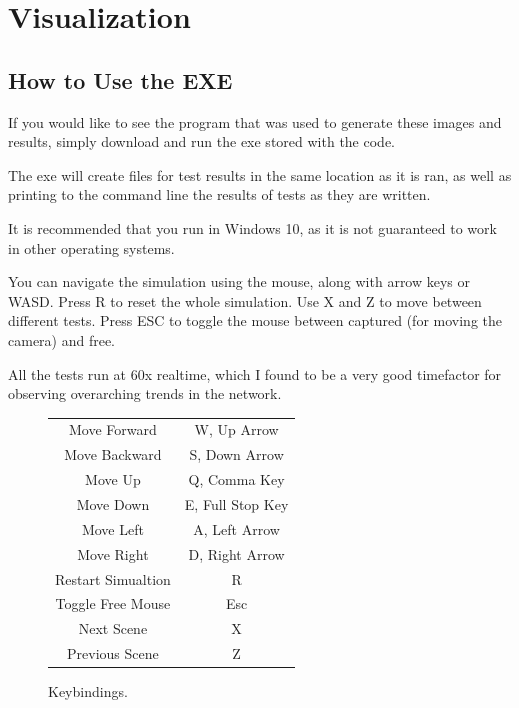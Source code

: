 \documentclass[12pt,a4paper,twoside,openright]{report}
\begin{document}
\section{Visualization}



\subsection{How to Use the EXE}

If you would like to see the program that was used to generate these images and results, simply download and run the exe stored with the code.

The exe will create files for test results in the same location as it is ran, as well as printing to the command line the results of tests as they are written.

It is recommended that you run in Windows 10, as it is not guaranteed to work in other operating systems.

You can navigate the simulation using the mouse, along with arrow keys or WASD. Press R to reset the whole simulation. Use X and Z to move between different tests. Press ESC to toggle the mouse between captured (for moving the camera) and free.

All the tests run at 60x realtime, which I found to be a very good timefactor for observing overarching trends in the network.

\begin{figure}
\begin{center}
\label{fig:Keybindings}
\caption{Keybindings.}
\begin{tabular}{ | c | c  | }
	\hline
	Move Forward & W, Up Arrow \\
	Move Backward & S, Down Arrow\\
	Move Up & Q, Comma Key\\
	Move Down & E, Full Stop Key\\
	Move Left & A, Left Arrow \\
	Move Right & D, Right Arrow \\
	Restart Simualtion & R \\
	Toggle Free Mouse & Esc \\
	Next Scene & X\\
	Previous Scene & Z\\
	\hline
\end{tabular}
\end{center}
\end{figure}
\end{document}
